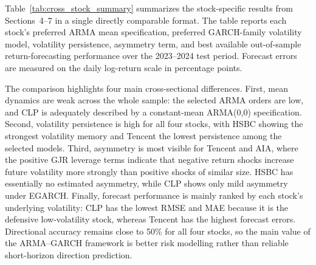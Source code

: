 \documentclass[11pt,a4paper]{article}
\begin{document}
Table~\ref{tab:cross_stock_summary} summarizes the stock-specific results from Sections~4--7 in a single directly comparable format. The table reports each stock's preferred ARMA mean specification, preferred GARCH-family volatility model, volatility persistence, asymmetry term, and best available out-of-sample return-forecasting performance over the 2023--2024 test period. Forecast errors are measured on the daily log-return scale in percentage points.

\begin{table}[htbp]
    \centering
    \caption{Cross-stock comparison of mean dynamics, volatility structure and forecasting performance.}
    \label{tab:cross_stock_summary}
    \small
\end{table}

The comparison highlights four main cross-sectional differences. First, mean dynamics are weak across the whole sample: the selected ARMA orders are low, and CLP is adequately described by a constant-mean ARMA(0,0) specification. Second, volatility persistence is high for all four stocks, with HSBC showing the strongest volatility memory and Tencent the lowest persistence among the selected models. Third, asymmetry is most visible for Tencent and AIA, where the positive GJR leverage terms indicate that negative return shocks increase future volatility more strongly than positive shocks of similar size. HSBC has essentially no estimated asymmetry, while CLP shows only mild asymmetry under EGARCH. Finally, forecast performance is mainly ranked by each stock's underlying volatility: CLP has the lowest RMSE and MAE because it is the defensive low-volatility stock, whereas Tencent has the highest forecast errors. Directional accuracy remains close to 50\% for all four stocks, so the main value of the ARMA--GARCH framework is better risk modelling rather than reliable short-horizon direction prediction.
\end{document}
